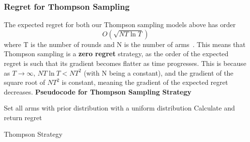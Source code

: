     \subsubsection{Regret for Thompson Sampling}
    The expected regret for both our Thompson sampling models above has order
    $$O(\sqrt{NT\ln{T}})$$
    where T is the number of rounds and N is the number of arms~\citep{agrawal2013further}. This means that Thompson sampling is a \textbf{zero regret} strategy, as the order of the expected regret is such that its gradient becomes flatter as time progresses. This is because as $T\to\infty$, $NT\ln{T} < NT^2$ (with N being a constant), and the gradient of the square root of $NT^2$ is constant, meaning the gradient of the expected regret decreases.
    \newline
    \textbf{Pseudocode for Thompson Sampling Strategy}
    \newline
    \begin{algorithm}[H]
        Set all arms with prior distribution with a uniform distribution\;
        Calculate and return regret
        \caption{Thompson Strategy}\label{alg:thompson_algorithm}
    \end{algorithm}